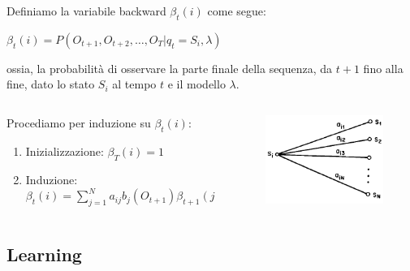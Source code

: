 \documentclass[mathserif]{beamer}
\begin{document}
\begin{frame}
 \begin{block}{}
  Definiamo la variabile backward $\beta_{t}(i)$ come segue:
\begin{center}
 $\beta_{t}(i) = P(O_{t+1}, O_{t+2}, \ldots, O_{T} | q_{t} = S_{i}, \lambda)$
\end{center}
ossia, la probabilit\`a di osservare la parte finale della sequenza, da $t+1$ fino alla fine, dato lo stato $S_{i}$ al tempo $t$ e il modello $\lambda$.
 \end{block}
\begin{block}{}
 \begin{columns}[c]
   \begin{column}[h]{8cm}
	Procediamo per induzione su $\beta_{t}(i)$:
	\begin{enumerate}
 	\item Inizializzazione: $\beta_{T}(i) = 1$
	\item Induzione: $\beta_{t}(i) = \sum_{j = 1}^{N} a_{ij}b_{j}(O_{t+1})\beta_{t+1}(j)$
	\end{enumerate}
    
   \end{column}
   \begin{column}[T]{2cm}
	\begin{figure}[ht]
	\includegraphics[scale=0.3]{beta.png}
	\label{fig:beta}
 \end{figure}
   \end{column}
 \end{columns}
 \end{block}
 
\end{frame}



\subsection{Learning}
\end{document}
